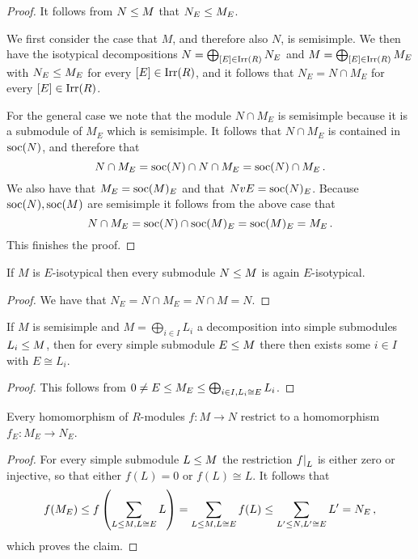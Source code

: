 \begin{proof}
  It follows from $N \leq M$ that $N_E \leq M_E$.
  
  We first consider the case that $M$, and therefore also $N$, is semisimple.
  We then have the isotypical decompositions $N = \bigoplus_{[E] \in \operatorname{Irr}(R)} N_E$ and $M = \bigoplus_{[E] \in \operatorname{Irr}(R)} M_E$ with $N_E \leq M_E$ for every $[E] \in \operatorname{Irr}(R)$, and it follows that $N_E = N \cap M_E$ for every $[E] \in \operatorname{Irr}(R)$.
  
  For the general case we note that the module $N \cap M_E$ is semisimple because it is a submodule of $M_E$ which is semisimple.
  It follows that $N \cap M_E$ is contained in $\operatorname{soc}(N)$, and therefore that
  \[
      N \cap M_E
    = \operatorname{soc}(N) \cap N \cap M_E
    = \operatorname{soc}(N) \cap M_E \,.
  \]
  We also have that $M_E = \operatorname{soc}(M)_E$ and that $NvE = \operatorname{soc}(N)_E$.
  Because $\operatorname{soc}(N), \operatorname{soc}(M)$ are semisimple it follows from the above case that
  \[
      N \cap M_E
    = \operatorname{soc}(N) \cap \operatorname{soc}(M)_E
    = \operatorname{soc}(M)_E
    = M_E \,.
  \]
  This finishes the proof.
\end{proof}


\begin{corollary}
  If $M$ is $E$-isotypical then every submodule $N \leq M$ is again $E$-isotypical.
\end{corollary}


\begin{proof}
  We have that $N_E = N \cap M_E = N \cap M = N$.
\end{proof}


\begin{lemma}
  If $M$ is semisimple and $M = \bigoplus_{i \in I} L_i$ a decomposition into simple submodules $L_i \leq M$, then for every simple submodule $E \leq M$ there then exists some $i \in I$ with $E \cong L_i$.
\end{lemma}


\begin{proof}
  This follows from $0 \neq E \leq M_E \leq \bigoplus_{i \in I, L_i \cong E} L_i$.
\end{proof}


\begin{lemma}
  Every homomorphism of $R$-modules $f \colon M \to N$ restrict to a homomorphism $f_E \colon M_E \to N_E$.
\end{lemma}


\begin{proof}
  For every simple submodule $L \leq M$ the restriction $\restrict{f}{L}$ is either zero or injective, so that either $f(L) = 0$ or $f(L) \cong L$.
  It follows that
  \[
              f(M_E)
    \leq f\left(\sum_{L \leq M, L \cong E} L \right)
    =         \sum_{L \leq M, L \cong E} f(L)
    \leq \sum_{L' \leq N, L' \cong E} L'
    =         N_E \,,
  \]
  which proves the claim.
\end{proof}



